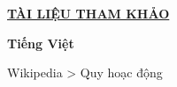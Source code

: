 \newpage
\changefontsizes{16pt}
\centerline{\textbf{\hyperlink{page.7}{TÀI LIỆU THAM KHẢO}}}

\vspace{1.2cm}
\changefontsizes{14pt}
\setlength{\parindent}{0cm}
\textbf{Tiếng Việt}

\bigskip
\changefontsizes{13pt}
\setlength{\parindent}{1cm}
Wikipedia > Quy hoạc động




